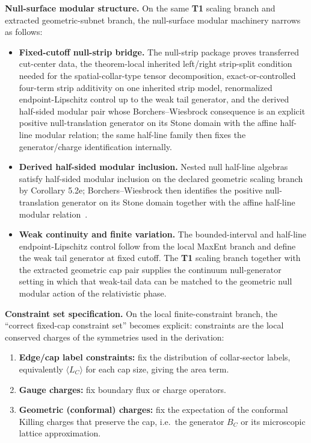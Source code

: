 \textbf{Null-surface modular structure.} On the same \textbf{T1} scaling branch and extracted geometric-subnet branch, the null-surface modular machinery narrows as follows:
\begin{itemize}
\item
\textbf{Fixed-cutoff null-strip bridge.} The null-strip package proves transferred cut-center data, the theorem-local inherited left/right strip-split condition needed for the spatial-collar-type tensor decomposition, exact-or-controlled four-term strip additivity on one inherited strip model, renormalized endpoint-Lipschitz control up to the weak tail generator, and the derived half-sided modular pair whose Borchers--Wiesbrock consequence is an explicit positive null-translation generator on its Stone domain with the affine half-line modular relation; the same half-line family then fixes the generator/charge identification internally.
\item
\textbf{Derived half-sided modular inclusion.} Nested null half-line algebras satisfy half-sided modular inclusion on the declared geometric scaling branch by Corollary 5.2e; Borchers--Wiesbrock then identifies the positive null-translation generator on its Stone domain together with the affine half-line modular relation~\cite{wiesbrock93}.
\item
\textbf{Weak continuity and finite variation.} The bounded-interval and half-line endpoint-Lipschitz control follow from the local MaxEnt branch and define the weak tail generator at fixed cutoff. The \textbf{T1} scaling branch together with the extracted geometric cap pair supplies the continuum null-generator setting in which that weak-tail data can be matched to the geometric null modular action of the relativistic phase.
\end{itemize}

\textbf{Constraint set specification.} On the local finite-constraint branch, the ``correct fixed-cap constraint set'' becomes explicit: constraints are the local conserved charges of the symmetries used in the derivation:
\begin{enumerate}
\def\labelenumi{\arabic{enumi}.}
\item
\textbf{Edge/cap label constraints:} fix the distribution of collar-sector labels, equivalently \(\langle L_C\rangle\) for each cap size, giving the area term.
\item
\textbf{Gauge charges:} fix boundary flux or charge operators.
\item
\textbf{Geometric (conformal) charges:} fix the expectation of the conformal Killing charges that preserve the cap, i.e.\ the generator \(B_C\) or its microscopic lattice approximation.
\end{enumerate}

